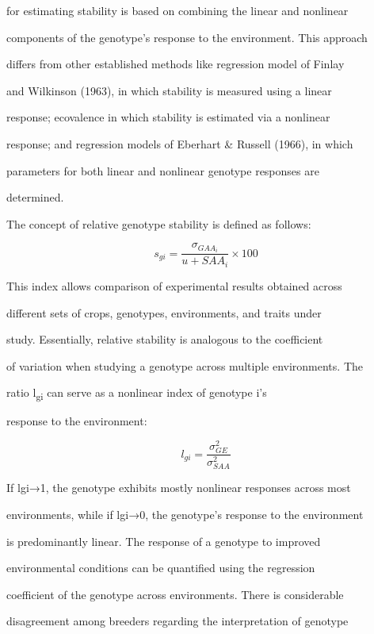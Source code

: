 \documentclass[10pt,twoside]{article}
\numberwithin{equation}{section}
\begin{document}
for estimating stability is based on combining the linear and nonlinear

components of the genotype's response to the environment. This approach

differs from other established methods like regression model of Finlay

and Wilkinson (1963), in which stability is measured using a linear

response; ecovalence in which stability is estimated via a nonlinear

response; and regression models of Eberhart \& Russell (1966), in which

parameters for both linear and nonlinear genotype responses are

determined.



The concept of relative genotype stability is defined as follows:



\[s_{gi} = \frac{\sigma_{{GAA}_{i}}}{u + {SAA}_{i}} \times 100\]



This index allows comparison of experimental results obtained across

different sets of crops, genotypes, environments, and traits under

study. Essentially, relative stability is analogous to the coefficient

of variation when studying a genotype across multiple environments. The

ratio l\textsubscript{gi} can serve as a nonlinear index of genotype i's

response to the environment:



\[l_{gi} = \frac{\sigma_{GE}^{2}}{\sigma_{SAA}^{2}}\]



If lgi→1, the genotype exhibits mostly nonlinear responses across most

environments, while if lgi→0, the genotype's response to the environment

is predominantly linear. The response of a genotype to improved

environmental conditions can be quantified using the regression

coefficient of the genotype across environments. There is considerable

disagreement among breeders regarding the interpretation of genotype
\end{document}
